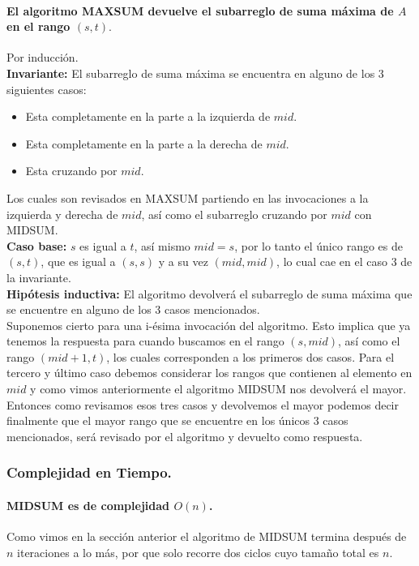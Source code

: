 \documentclass[12pt]{article}
\begin{document}
\paragraph{El algoritmo MAXSUM devuelve el subarreglo de suma máxima de $A$ en el rango $(s, t).$} 
Por inducción.\\
\textbf{Invariante:} El subarreglo de suma máxima se encuentra en alguno de los 3 siguientes casos:
\begin{itemize}
	\item Esta completamente en la parte a la izquierda de $mid$.
	\item Esta completamente en la parte a la derecha de $mid$.
	\item Esta cruzando por $mid$.
\end{itemize}
Los cuales son revisados en MAXSUM partiendo en las invocaciones a la izquierda y derecha de $mid$, así como el subarreglo cruzando por $mid$ con MIDSUM.\\
\textbf{Caso base:} $s$ es igual a $t$, así mismo $mid=s$, por lo tanto el único rango es de $(s,t)$, que es igual a $(s, s)$ y a su vez $(mid, mid)$, lo cual cae en el caso 3 de la invariante.\\
\textbf{Hipótesis inductiva:} El algoritmo devolverá el subarreglo de suma máxima que se encuentre en alguno de los 3 casos mencionados.\\
Suponemos cierto para una i-ésima invocación del algoritmo. Esto implica que ya tenemos la respuesta para cuando buscamos en el rango $(s, mid)$, así como el rango $(mid + 1, t)$, los cuales corresponden a los primeros dos casos. Para el tercero y último caso debemos considerar los rangos que contienen al elemento en $mid$ y como vimos anteriormente el algoritmo MIDSUM nos devolverá el mayor. Entonces como revisamos esos tres casos y devolvemos el mayor podemos decir finalmente que el mayor rango que se encuentre en los únicos 3 casos mencionados, será revisado por el algoritmo y devuelto como respuesta.
\subsubsection{Complejidad en Tiempo.}
\paragraph{MIDSUM es de complejidad $O(n)$.} Como vimos en la sección anterior el algoritmo de MIDSUM termina después de $n$ iteraciones a lo más, por que solo recorre dos ciclos cuyo tamaño total es $n$.
\end{document}
